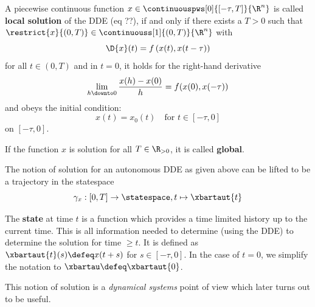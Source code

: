 \begin{definition}
    \label{definition-solution-dde}

    A piecewise continuous function $x\in \continuouspws[0]{[-\tau,T]}{\R^n}$ is called \textbf{local solution} of the DDE (eq ??), if and only if there exists a $T>0$ such that $\restrict{x}{(0,T)}\in \continuouss[1]{(0,T)}{\R^n}$ with
    \begin{equation}
        \D{x}(t) = f\left(x(t),x(t-\tau)\right)
    \end{equation}
    for all $t\in (0,T)$ and in $t=0$, it holds for the right-hand derivative \begin{equation}
        \lim_{h\downto 0}\frac{x(h)-x(0)}{h}=f(x(0),x(-\tau))
    \end{equation}
    and obeys the initial condition:
    \begin{equation}
        x(t) = x_0(t) \quad\text{for } t\in [-\tau,0]
    \end{equation}
    on $[-\tau,0]$.



    If the function $x$ is solution for all $T\in\R_{>0}$, it is called \textbf{global}.

\end{definition}

The notion of solution for an autonomous DDE as given above can be lifted to be a trajectory in the statespace
\begin{equation}
    \gamma_x:[0,T]\rightarrow\statespace,\\ t\mapsto\xbartaut{t}
\end{equation}

The \textbf{state} at time $t$ is a function which provides a time limited history up to the current time. This is all information needed to determine (using the DDE) to determine the solution for time $\geq t$. It is defined as $\xbartaut{t}(s)\defeq x(t+s)$ for $s\in [-\tau,0]$. In the case of $t=0$, we simplify the notation to $\xbartau \defeq \xbartaut{0}$.

This notion of solution is a \emph{dynamical systems} point of view which later turns out to be useful.


